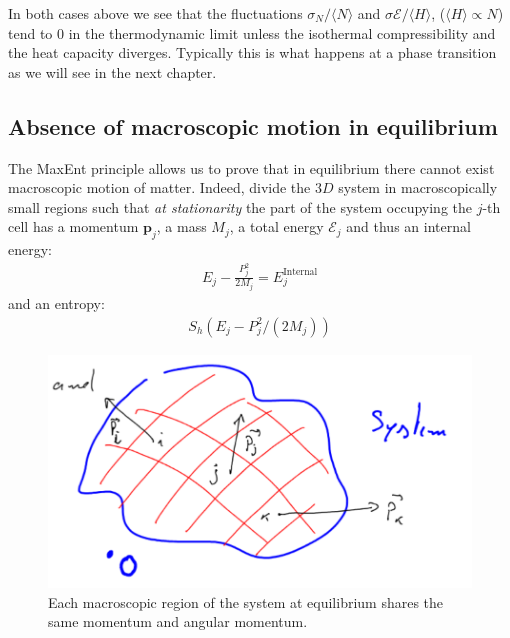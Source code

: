 \documentclass[../template.tex]{subfiles}
\begin{document}
In both cases above we see that the fluctuations $\sigma_N/\langle N \rangle$ and $\sigma \mathcal{E}/\langle H \rangle$, ($\langle H \rangle \propto N$) tend to $0$ in the thermodynamic limit unless the isothermal compressibility and the heat capacity diverges. Typically this is what happens at a phase transition as we will see in the next chapter.

\subsection{Absence of macroscopic motion in equilibrium}
The MaxEnt principle allows us to prove that in equilibrium there cannot exist macroscopic motion of matter. Indeed, divide the $3D$ system in macroscopically small regions such that \textit{at stationarity} the part of the system occupying the $j$-th cell has a momentum $\bm{p}_j$, a mass $M_j$, a total energy $\mathcal{E}_j$ and thus an internal energy:
\begin{align*}
    E_j - \frac{P_j^2}{2 M_j} = E_j^{\mathrm{Internal}} 
\end{align*} 
and an entropy:
\begin{align*}
    S_h(E_j - P_j^2/(2M_j))
\end{align*}

\begin{figure}[H]
    \centering
    \includegraphics{image005.png}
    \caption{Each macroscopic region of the system at equilibrium shares the same momentum and angular momentum.\label{fig:macmov}}
\end{figure}
\end{document}
